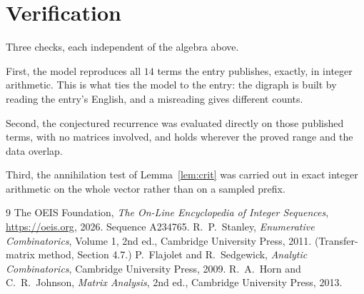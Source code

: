 \documentclass[11pt,a4paper]{article}
\theoremstyle{plain}
\theoremstyle{definition}
\begin{document}
\section{Verification}

Three checks, each independent of the algebra above.

First, the model reproduces all $14$ terms the entry publishes, exactly, in integer
arithmetic. This is what ties the model to the entry: the digraph is built by reading the
entry's English, and a misreading gives different counts.

Second, the conjectured recurrence was evaluated directly on those published terms, with no
matrices involved, and holds wherever the proved range and the data overlap.

Third, the annihilation test of Lemma~\ref{lem:crit} was carried out in exact integer
arithmetic on the whole vector rather than on a sampled prefix.

\begin{thebibliography}{9}
 The OEIS Foundation, \emph{The On-Line Encyclopedia of Integer
Sequences}, \url{https://oeis.org}, 2026. Sequence A234765.
 R.~P.~Stanley, \emph{Enumerative Combinatorics}, Volume 1, 2nd ed.,
Cambridge University Press, 2011. (Transfer-matrix method, Section 4.7.)
 P.~Flajolet and R.~Sedgewick, \emph{Analytic Combinatorics}, Cambridge
University Press, 2009.
 R.~A.~Horn and C.~R.~Johnson, \emph{Matrix Analysis}, 2nd ed., Cambridge
University Press, 2013.
\end{thebibliography}
\end{document}
